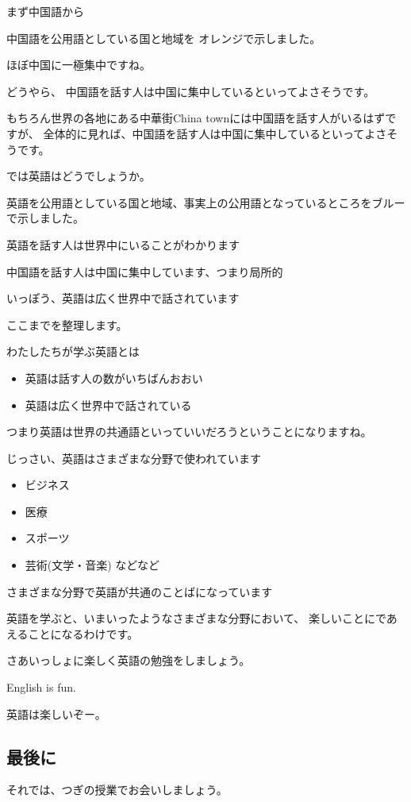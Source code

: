\documentclass[12pt]{jlreq}
\begin{document}
まず中国語から

\hrulefill

中国語を公用語としている国と地域を
オレンジで示しました。

ほぼ中国に一極集中ですね。

\hrulefill

どうやら、
中国語を話す人は中国に集中しているといってよさそうです。

もちろん世界の各地にある中華街China townには中国語を話す人がいるはずですが、
全体的に見れば、中国語を話す人は中国に集中しているといってよさそうです。

では英語はどうでしょうか。

\hrulefill

英語を公用語としている国と地域、事実上の公用語となっているところをブルーで示しました。

\hrulefill

英語を話す人は世界中にいることがわかります

\hrulefill

中国語を話す人は中国に集中しています、つまり局所的

いっぽう、英語は広く世界中で話されています

\hrulefill

ここまでを整理します。

わたしたちが学ぶ英語とは

\begin{itemize}
 \item 英語は話す人の数がいちばんおおい

 \item 英語は広く世界中で話されている
\end{itemize}

 

つまり英語は世界の共通語といっていいだろうということになりますね。



\hrulefill

じっさい、英語はさまざまな分野で使われています

\begin{itemize}
 \item ビジネス
 \item 医療
 \item スポーツ
 \item 芸術(文学・音楽) などなど
\end{itemize}
さまざまな分野で英語が共通のことばになっています


\hrulefill

英語を学ぶと、いまいったようなさまざまな分野において、
楽しいことにであえることになるわけです。

さあいっしょに楽しく英語の勉強をしましょう。

\hrulefill

English is fun.

英語は楽しいぞー。



\subsection*{最後に}

それでは、つぎの授業でお会いしましょう。


\hrulefill
\hrulefill
\hrulefill
\hrulefill
\end{document}
